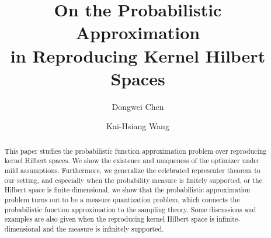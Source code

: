 \documentclass{amsart}
\numberwithin{equation}{section}
\theoremstyle{plain}
\theoremstyle{remark}
\theoremstyle{definition}
\begin{document}

\title[Probabilistic Approximation in RKHS]{On the Probabilistic Approximation \\ in Reproducing Kernel Hilbert Spaces}



\author{Dongwei Chen}
\address{Department of Mathematics, Colorado State University, CO, US}

\author{Kai-Hsiang Wang}
\address{Department of Mathematics, Northwestern University, IL, US}
 
\begin{abstract}
This paper studies the probabilistic function approximation problem over reproducing kernel Hilbert spaces.
We show the existence and uniqueness of the optimizer under mild assumptions. 
Furthermore, we generalize the celebrated representer theorem to our setting, and especially when the probability measure is finitely supported, or the Hilbert space is finite-dimensional, we show that the probabilistic approximation problem turns out to be a measure quantization problem, which connects the probabilistic function approximation to the sampling theory.  Some discussions and examples are also given when the reproducing kernel Hilbert space is infinite-dimensional and the measure is infinitely supported. 

\end{abstract}



\maketitle

\end{document}
